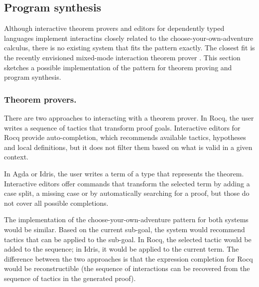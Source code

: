 \documentclass[nonacm,anonymous,sigplan,screen]{acmart}
\begin{document}

\subsection{Program synthesis}
\label{sec:examples-thm}

Although interactive theorem provers and editors for dependently typed languages implement
interactins closely related to the choose-your-own-adventure calculus, there is no existing
system that fits the pattern exactly. The closest fit is the recently envisioned mixed-mode interaction theorem prover \cite{verter-2024-mixed}.
This section sketches a possible implementation of the pattern for theorem proving and
program synthesis.

\subsubsection*{Theorem provers.}
There are two approaches to interacting with a theorem prover. In Rocq, the user
writes a sequence of tactics that transform proof goals. Interactive editors for Rocq
\cite{pitclaudel-2016-companycoq,aspinall-2000-general} provide auto-completion, which recommends
available tactics, hypotheses and local definitions, but it does not filter them based on what
is valid in a given context.

In Agda or Idris, the user writes a term of a type that represents the theorem. Interactive
editors \cite{brady-2015-idris} offer commands that transform the selected term by
adding a case split, a missing case or by automatically searching for a proof, but those do not
cover all possible completions.

The implementation of the choose-your-own-adventure pattern for both systems would be
similar. Based on the current sub-goal, the system would recommend  tactics that can be
applied to the sub-goal. In Rocq, the selected tactic would be added to the sequence; in
Idris, it would be applied to the current term. The difference between the two approaches is that
the expression completion for Rocq would be reconstructible (the sequence of interactions can
be recovered from the sequence of tactics in the generated proof).
\end{document}
